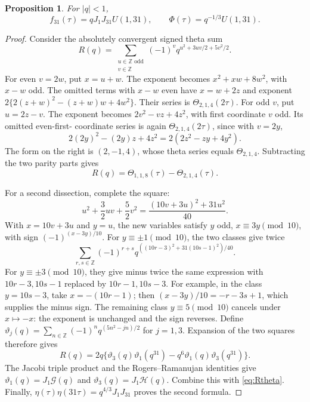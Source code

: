\documentclass[11pt,reqno]{amsart}
\newcommand{\ZZ}{\mathbb Z}
\newcommand{\RG}{\mathcal G}
\newcommand{\RH}{\mathcal H}
\newtheorem{proposition}[theorem]{Proposition}
\theoremstyle{remark}
\numberwithin{equation}{section}
\begin{document}
\begin{proposition}\label{prop:thetaU}
For $|q|<1$,
\begin{equation}\label{eq:thetaU}
 f_{31}(\tau)=qJ_1J_{31}U(1,31),\qquad
 \Phi(\tau)=q^{-1/3}U(1,31).
\end{equation}
\end{proposition}
\begin{proof}
Consider the absolutely convergent signed theta sum
\[
 R(q)=\sum_{\substack{u\in\ZZ\text{ odd}\\v\in\ZZ}}
 (-1)^v q^{u^2+3uv/2+5v^2/2}.
\]
For even $v=2w$, put $x=u+w$. The exponent becomes
$x^2+xw+8w^2$, with $x-w$ odd. The omitted terms with $x-w$ even
have $x=w+2z$ and exponent
$2\{2(z+w)^2-(z+w)w+4w^2\}$.
Their series is $\Theta_{2,1,4}(2\tau)$.
For odd $v$, put $u=2z-v$. The exponent becomes
$2v^2-vz+4z^2$, with first coordinate $v$ odd. Its omitted even-first-
coordinate series is again $\Theta_{2,1,4}(2\tau)$, since
with $v=2y$,
\[
 2(2y)^2-(2y)z+4z^2=2(2z^2-zy+4y^2).
\]
The form on the right is $(2,-1,4)$, whose theta series equals
$\Theta_{2,1,4}$.
Subtracting the two parity parts gives
\begin{equation}\label{eq:Rtheta}
 R(q)=\Theta_{1,1,8}(\tau)-\Theta_{2,1,4}(\tau).
\end{equation}

For a second dissection, complete the square:
\[
 u^2+\frac32uv+\frac52v^2
 =\frac{(10v+3u)^2+31u^2}{40}.
\]
With $x=10v+3u$ and $y=u$, the new variables satisfy
$y$ odd, $x\equiv3y\pmod {10}$, with sign $(-1)^{(x-3y)/10}$.
For $y\equiv\pm1\pmod {10}$, the two classes give twice
\[
 \sum_{r,s\in\ZZ}(-1)^{r+s}
 q^{((10r-3)^2+31(10s-1)^2)/40}.
\]
For $y\equiv\pm3\pmod {10}$, they give minus twice the same expression
with $10r-3,10s-1$ replaced by $10r-1,10s-3$.
For example, in the class $y=10s-3$, take $x=-(10r-1)$; then
$(x-3y)/10=-r-3s+1$, which supplies the minus sign.
The remaining class $y\equiv5\pmod {10}$ cancels under $x\mapsto-x$:
the exponent is unchanged and the sign reverses.
Define $\vartheta_j(q)=\sum_{n\in\ZZ}(-1)^nq^{(5n^2-jn)/2}$ for $j=1,3$.
Expansion of the two squares therefore gives
\[
 R(q)=2q\{\vartheta_3(q)\vartheta_1(q^{31})-q^6\vartheta_1(q)\vartheta_3(q^{31})\}.
\]
The Jacobi triple product and the Rogers--Ramanujan identities give
$\vartheta_1(q)=J_1\RG(q)$ and $\vartheta_3(q)=J_1\RH(q)$.
Combine this with \eqref{eq:Rtheta}. Finally,
$\eta(\tau)\eta(31\tau)=q^{4/3}J_1J_{31}$ proves the second formula.
\end{proof}
\end{document}
